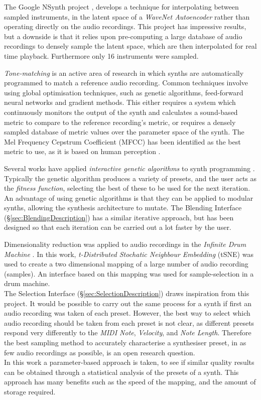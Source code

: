 \documentclass[11pt, oneside]{report}   	%
\begin{document}
The Google NSynth project \cite{NSynth}, develops a technique for interpolating between sampled instruments, in the latent space of a \emph{WaveNet Autoencoder} rather than operating directly on the audio recordings. This project has impressive results, but a downside is that it relies upon pre-computing a large database of audio recordings to densely sample the latent space, which are then interpolated for real time playback. Furthermore only 16 instruments were sampled.

\emph{Tone-matching} is an active area of research in which synths are automatically programmed to match a reference audio recording. Common techniques involve using global optimisation techniques, such as genetic algorithms, feed-forward neural networks and gradient methods. This either requires a system which continuously monitors the output of the synth and calculates a sound-based metric to compare to the reference recording's metric, or requires a densely sampled database of metric values over the parameter space of the synth.  The Mel Frequency Cepstrum Coefficient (MFCC) has been identified as the best metric to use, as it is based on human perception \cite{YeeKing}.

Several works have applied \emph{interactive genetic algorithms} to synth programming \cite{EvolutionaryInteractive, GenSynth, GenComparison}. Typically the genetic algorithm produces a variety of presets, and the user acts as the \emph{fitness function}, selecting the best of these to be used for the next iteration. An advantage of using genetic algorithms is that they can be applied to modular synths, allowing the synthesis architecture to mutate. The Blending Interface (\S \ref{sec:BlendingDescription}) has a similar iterative approach, but has been designed so that each iteration can be carried out a lot faster by the user. 

Dimensionality reduction was applied to audio recordings in the \emph{Infinite Drum Machine} \cite{InfiniteDrum}. In this work, \emph{t-Distributed Stochatic Neighbour Embedding} (tSNE) was used to create a two dimensional mapping of a large number of audio recording (samples). An interface based on this mapping was used for sample-selection in a drum machine. \\
The Selection Interface (\S \ref{sec:SelectionDescription}) draws inspiration from this project. It would be possible to carry out the same process for a synth if first an audio recording was taken of each preset. However, the best way to select which audio recording should be taken from each preset is not clear, as different presets respond very differently to the \emph{MIDI Note}, \emph{Velocity}, and \emph{Note Length}. Therefore the best sampling method to accurately characterise a synthesiser preset, in as few audio recordings as possible, is an open research question.\\
In this work a parameter-based approach is taken, to see if similar quality results can be obtained through a statistical analysis of the presets of a synth. This approach has many benefits such as the speed of the mapping, and the amount of storage required.
\end{document}
